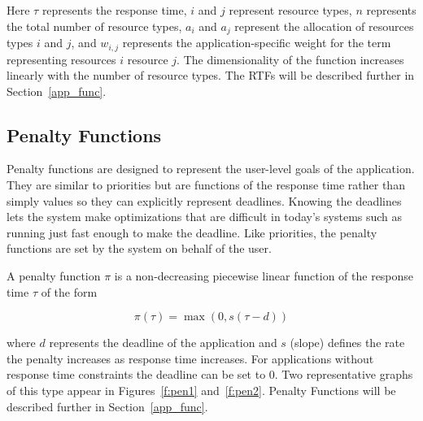 Here $\tau$ represents the response time, $i$ and $j$ represent resource types, $n$ represents the total number of resource types, $a_{i}$ and $a_{j}$ represent the allocation of resources types $i$ and $j$, and $w_{i,j}$ represents the application-specific weight for the term representing resources $i$ resource $j$.  The dimensionality of the function increases linearly with the number of resource types. The RTFs will be described further in Section~\ref{app_func}.

\subsection*{Penalty Functions}
Penalty functions are designed to represent the user-level goals of the application. They are similar to priorities but are functions of the response time rather than simply values so they can explicitly represent deadlines.  Knowing the deadlines lets the system make optimizations that are difficult in today's systems such as running just fast enough to make the deadline. Like priorities, the penalty functions are set by the system on behalf of the user.

A \pacora penalty function $\pi$ is a non-decreasing piecewise linear function of the response time $\tau$ of the form

\begin{equation}\label{pen_eq}
\pi(\tau) = \max(0, s(\tau - d))
\end{equation}

where $d$ represents the deadline of the application and $s$ (slope) defines the rate the penalty increases as response time increases. For applications without response time constraints the deadline can be set to $0$. Two representative graphs of this type appear in Figures~\ref{f:pen1} and~\ref{f:pen2}. Penalty Functions will be described further in Section~\ref{app_func}.

